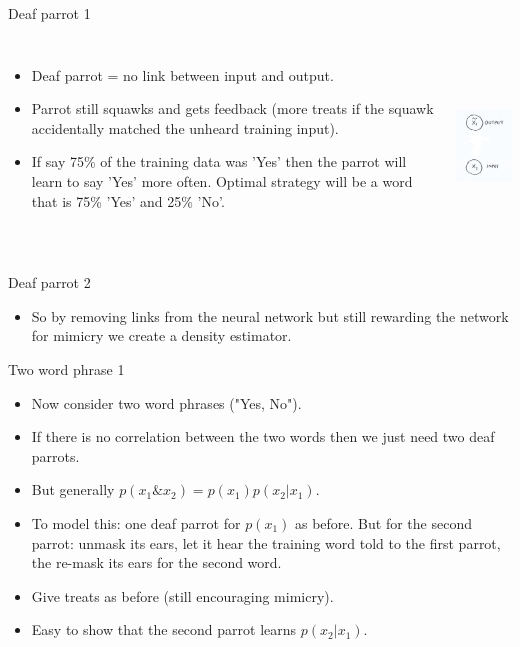 \documentclass[usenames,dvipsnames]{beamer}
\begin{document}
\begin{frame}{Deaf parrot 1}
	\begin{columns}
    \begin{itemize}
      \item{Deaf parrot = no link between input and output.}
	\item{Parrot still squawks and gets feedback (more treats if the squawk accidentally matched the unheard training input).}
	\item{If say 75\% of the training data was 'Yes' then the parrot will learn to say 'Yes' more often. Optimal strategy will be a word that is 75\% 'Yes' and 25\% 'No'.}
    \end{itemize}
             \centering
             \includegraphics[height=5cm, width=3.5cm]{image_02}
         \end{columns} 
\end{frame}

\begin{frame}{Deaf parrot 2}
    \begin{itemize}
      \item{So by removing links from the neural network but still rewarding the network for mimicry we create a density estimator.}
    \end{itemize}
\end{frame}

\begin{frame}{Two word phrase 1}
    \begin{itemize}
      \item{Now consider two word phrases ("Yes, No").}
	\item{If there is no correlation between the two words then we just need two deaf parrots.}
	\item{But generally $p(x_1 \& x_2) = p(x_1) p(x_2 | x_1)$.}
	\item{To model this: one deaf parrot for $p(x_1)$ as before. But for the second parrot: unmask its ears, let it hear the training word told to the first parrot, the re-mask its ears for the second word.}
	\item{Give treats as before (still encouraging mimicry).}
	\item{Easy to show that the second parrot learns $p(x_2 | x_1)$.}
    \end{itemize}
\end{frame}
\end{document}
